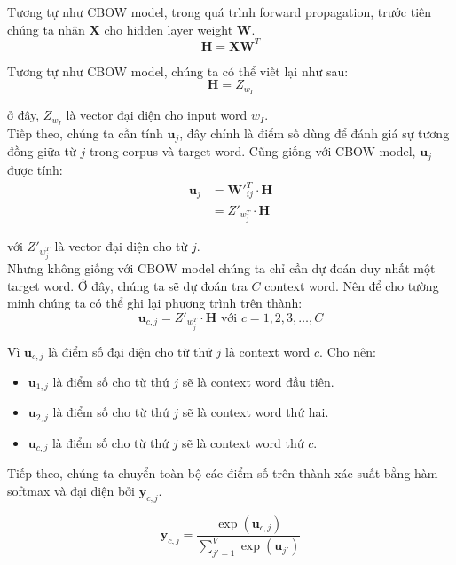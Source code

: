 \documentclass[12pt]{article}
\newcommand{\twiceIndent}{\hspace{\parindent}}
\newcommand{\itemsizePaddingLeft}{\setlength{\itemindent}{0.6cm}}
\begin{document}
\indent Tương tự như CBOW model, trong quá trình forward propagation, trước tiên chúng ta nhân $\boldsymbol{X}$ cho hidden layer weight $\boldsymbol{W}$.
$$\boldsymbol{H} = \boldsymbol{XW}^T$$

\indent Tương tự như CBOW model, chúng ta có thể viết lại như sau:
$$\boldsymbol{H} = Z_{w_I}$$

\twiceIndent ở đây, $Z_{w_I}$ là vector đại diện cho input word $w_I$.\\

\indent Tiếp theo, chúng ta cần tính $\boldsymbol{u}_j$, đây chính là điểm số dùng để đánh giá sự tương đồng giữa từ $j$ trong corpus và target word. Cũng giống với CBOW model, $\boldsymbol{u}_j$ được tính:
$$\begin{aligned}\boldsymbol{u}_j &= \boldsymbol{W'}_{ij}^T \cdot \boldsymbol{H} \\ 
  &= Z'_{w_j^T} \cdot \boldsymbol{H} \end{aligned}$$

\twiceIndent với $Z'_{w_j^T}$ là vector đại diện cho từ $j$.\\

\indent Nhưng không giống với CBOW model chúng ta chỉ cần dự đoán duy nhất một target word. Ở đây, chúng ta sẽ dự đoán tra $C$ context word. Nên để cho tường minh chúng ta có thể ghi lại phương trình trên thành:
$$\boldsymbol{u}_{c,j} = Z'_{w_j^T} \cdot \boldsymbol{H} \text{ với } c = 1, 2, 3, \hdots,C$$

\indent Vì $\boldsymbol{u}_{c,j}$ là điểm số đại diện cho từ thứ $j$ là context word $c$. Cho nên:
\begin{itemize}
  \itemsizePaddingLeft
  \item $\boldsymbol{u}_{1,j}$ là điểm số cho từ thứ $j$ sẽ là context word đầu tiên.
  \item $\boldsymbol{u}_{2,j}$ là điểm số cho từ thứ $j$ sẽ là context word thứ hai.
  \item $\boldsymbol{u}_{c,j}$ là điểm số cho từ thứ $j$ sẽ là context word thứ $c$.
\end{itemize}

\vskip 0.5cm
\indent Tiếp theo, chúng ta chuyển toàn bộ các điểm số trên thành xác suất bằng hàm softmax và đại diện bởi $\boldsymbol{y}_{c,j}$.

\begin{equation}
  \boldsymbol{y}_{c,j} = \dfrac{\exp{(\boldsymbol{u}_{c,j})}}{\sum_{j'=1}^V \exp{(\boldsymbol{u}_{j'})}}
\end{equation}
\end{document}
